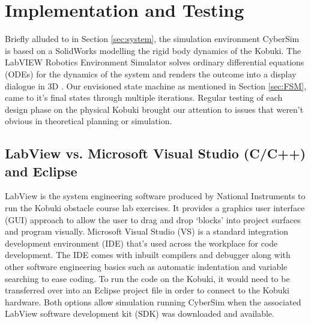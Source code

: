 \newpage
\section{Implementation and Testing}\label{sec:testing}
Briefly alluded to in Section \ref{sec:system}, the simulation environment CyberSim is based on a SolidWorks modelling the rigid body dynamics of the Kobuki. The LabVIEW Robotics Environment Simulator solves ordinary differential equations (ODEs) for the dynamics of the system and renders the outcome into a display dialogue in 3D \cite{labguide}. Our envisioned state machine as mentioned in Section \ref{sec:FSM}, came to it's final states through multiple iterations. Regular testing of each design phase on the physical Kobuki brought our attention to issues that weren't obvious in theoretical planning or simulation.

\subsection{LabView vs. Microsoft Visual Studio (C/C++) and Eclipse}
\vspace{-0.2cm} LabView is the system engineering software produced by National Instruments to run the Kobuki obstacle course lab exercises. It provides a graphics user interface (GUI) approach to allow the user to drag and drop `blocks' into project surfaces and program visually. Microsoft Visual Studio (VS) is a standard integration development environment (IDE) that's used across the workplace for code development. The IDE comes with inbuilt compilers and debugger along with other software engineering basics such as automatic indentation and variable searching to ease coding. To run the code on the Kobuki, it would need to be transferred over into an Eclipse project file in order to connect to the Kobuki hardware. Both options allow simulation running CyberSim when the associated LabView software development kit (SDK) was downloaded and available.\\

